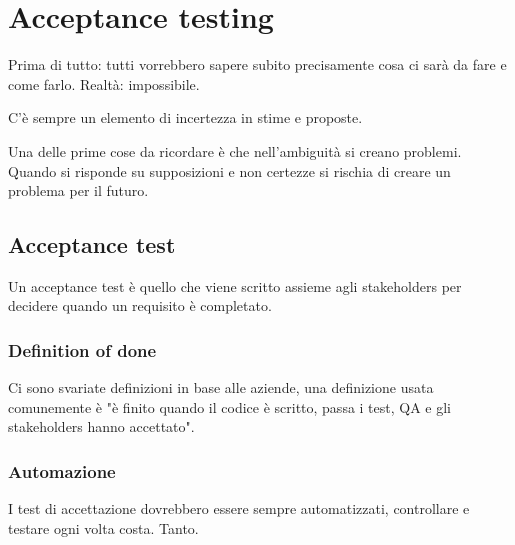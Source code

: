 \documentclass[11pt,a4paper]{book}
\begin{document}
\chapter{Acceptance testing}
Prima di tutto: tutti vorrebbero sapere subito precisamente cosa ci sarà da fare e come farlo. Realtà: impossibile.

C'è sempre un elemento di incertezza in stime e proposte.

Una delle prime cose da ricordare è che nell'ambiguità si creano problemi. Quando si risponde su supposizioni e non certezze si rischia di creare un problema per il futuro.

\section{Acceptance test}
Un acceptance test è quello che viene scritto assieme agli stakeholders per decidere quando un requisito è completato.

\subsection{Definition of done}
Ci sono svariate definizioni in base alle aziende, una definizione usata comunemente è "è finito quando il codice è scritto, passa i test, QA e gli stakeholders hanno accettato".

\subsection{Automazione}
I test di accettazione dovrebbero essere sempre automatizzati, controllare e testare ogni volta costa. Tanto.
\end{document}
